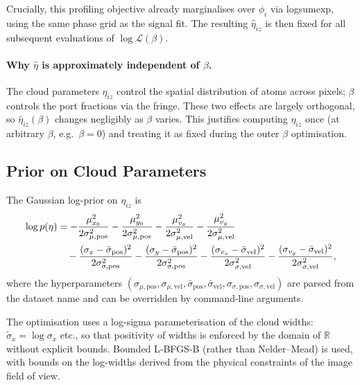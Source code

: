 \documentclass[11pt,a4paper]{article}
\newcommand{\Lcal}{\mathcal{L}}
\newcommand{\R}{\mathbb{R}}
\begin{document}
Crucially, this profiling objective already marginalises over $\phi_i$ via
logsumexp, using the same phase grid as the signal fit.  The resulting
$\hat\eta_{iz}$ is then fixed for all subsequent evaluations of
$\log\Lcal(\beta)$.

\paragraph{Why $\hat\eta$ is approximately independent of $\beta$.}
The cloud parameters $\eta_{iz}$ control the spatial distribution of atoms
across pixels; $\beta$ controls the port fractions via the fringe.  These two
effects are largely orthogonal, so $\hat\eta_{iz}(\beta)$ changes negligibly
as $\beta$ varies.  This justifies computing $\hat\eta_{iz}$ once (at
arbitrary $\beta$, e.g.\ $\beta = 0$) and treating it as fixed during the
outer $\beta$ optimisation.

\subsection{Prior on Cloud Parameters}
\label{sec:prior}

The Gaussian log-prior on $\eta_{iz}$ is
\begin{align}
  \log p(\eta)
  &= -\frac{\mu_{x_0}^2}{2\sigma_{\mu,\mathrm{pos}}^2}
     -\frac{\mu_{y_0}^2}{2\sigma_{\mu,\mathrm{pos}}^2}
     -\frac{\mu_{v_x}^2}{2\sigma_{\mu,\mathrm{vel}}^2}
     -\frac{\mu_{v_y}^2}{2\sigma_{\mu,\mathrm{vel}}^2} \notag\\
  &\quad
     -\frac{(\sigma_x - \bar\sigma_\mathrm{pos})^2}{2\sigma_{\sigma,\mathrm{pos}}^2}
     -\frac{(\sigma_y - \bar\sigma_\mathrm{pos})^2}{2\sigma_{\sigma,\mathrm{pos}}^2}
     -\frac{(\sigma_{v_x} - \bar\sigma_\mathrm{vel})^2}{2\sigma_{\sigma,\mathrm{vel}}^2}
     -\frac{(\sigma_{v_y} - \bar\sigma_\mathrm{vel})^2}{2\sigma_{\sigma,\mathrm{vel}}^2},
  \label{eq:prior}
\end{align}
where the hyperparameters $(\sigma_{\mu,\mathrm{pos}},\sigma_{\mu,\mathrm{vel}},
\bar\sigma_\mathrm{pos},\bar\sigma_\mathrm{vel},\sigma_{\sigma,\mathrm{pos}},
\sigma_{\sigma,\mathrm{vel}})$ are parsed from the dataset name and can be
overridden by command-line arguments.

The optimisation uses a log-sigma parameterisation of the cloud widths:
$\tilde\sigma_x = \log\sigma_x$ etc., so that positivity of widths is enforced
by the domain of $\R$ without explicit bounds.  Bounded L-BFGS-B (rather
than Nelder--Mead) is used, with bounds on the log-widths derived from the
physical constraints of the image field of view.
\end{document}
